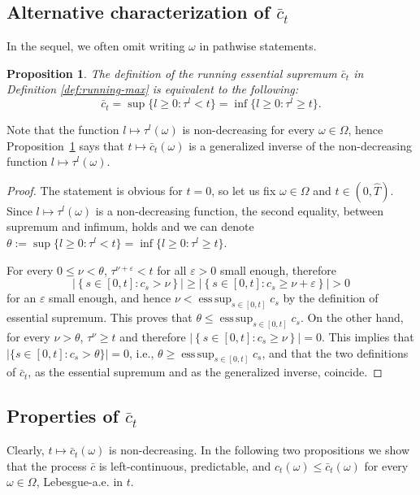 \documentclass[11pt, oneside]{article}   	%
\DeclareMathOperator*{\esssup}{ess\,sup}
\theoremstyle{plain}
\newtheorem{prop}[thm]{Proposition}
\theoremstyle{definition}
\theoremstyle{remark}
\begin{document}
\subsection{Alternative characterization of $\bar{c}_t$}
In the sequel, we often omit writing $\omega$ in pathwise statements.
\begin{prop}\label{prop:second-def}
The definition of the running essential supremum $\bar{c}_t$ in Definition \ref{def:running-max} is equivalent to the following:
$$\bar{c}_t=\sup\{l\geq 0: \tau^l<t\}=\inf\{l\geq 0: \tau^l\geq t\}.$$
\end{prop}
Note that the function $l\mapsto\tau^l(\omega)$ is non-decreasing for every $\omega\in\Omega$, hence Proposition~\ref{prop:second-def} says that $t\mapsto\bar{c}_t(\omega)$ is a generalized inverse of the non-decreasing function $l\mapsto\tau^l(\omega)$.
\begin{proof}
The statement is obvious for $t=0$, so let us fix $\omega\in\Omega$ and $t\in(0,\hat{T})$. Since $l\mapsto\tau^l(\omega)$ is a non-decreasing function, the second equality, between supremum and infimum, holds and we can denote $\theta:=\sup\{l\geq 0: \tau^l<t\}=\inf\{l\geq 0: \tau^l\geq t\}$.

For every $0\leq\nu<\theta$, $\tau^{\nu+\varepsilon}<t$ for all $\varepsilon>0$ small enough, therefore $$\vert\left\{s\in[0,t]: c_s>\nu\right\}\vert\geq\vert\left\{s\in[0,t]: c_s\geq\nu+\varepsilon\right\}\vert>0$$ for an $\varepsilon$ small enough, and hence $\nu<\esssup_{s\in[0,t]}c_s$ by the definition of essential supremum. This proves that $\theta\leq\esssup_{s\in[0,t]}c_s$. On the other hand, for every $\nu>\theta$, $\tau^\nu\geq t$ and therefore
$\vert \left\{s\in[0,t]: c_s\geq \nu\right\}\vert=0$. This implies that $\vert \{s\in[0,t]: c_s> \theta\}\vert=0$, i.e., $\theta\geq\esssup_{s\in[0,t]}c_s$,
and that the two definitions of $\bar{c}_t$, as the essential supremum and as the generalized inverse, coincide.
\end{proof}



\subsection{Properties of $\bar{c}_t$}
Clearly, $t\mapsto\bar{c}_t(\omega)$ is non-decreasing. In the following two propositions we show that the process $\bar{c}$ is left-continuous, predictable, and $c_t(\omega)\leq\bar{c}_t(\omega)$ for every $\omega\in\Omega$, Lebesgue-a.e. in $t$. 
\end{document}
